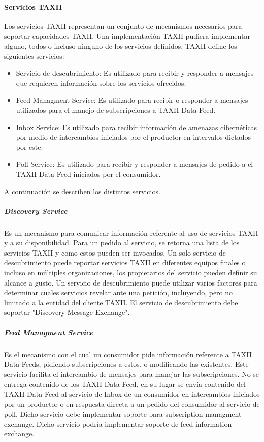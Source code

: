 \paragraph{Servicios TAXII}

Los servicios TAXII representan un conjunto de mecanismos necesarios para 
soportar capacidades TAXII. Una implementación TAXII pudiera implementar alguno, 
todos o incluso ninguno de los servicios definidos.
TAXII define los siguientes servicios:
\begin{itemize}
  \item Servicio de descubrimiento: Es utilizado para recibir y responder a 
  mensajes que requieren información sobre los servicios ofrecidos.
  \item Feed Managment Service: Es utilizado para recibir o responder a mensajes 
  utilizados para el manejo de subscripciones a TAXII Data Feed.
  \item Inbox Service: Es utilizado para recibir información de amenazas 
  cibernéticas por medio de intercambios iniciados por el productor en intervalos 
  dictados por este.
  \item Poll Service: Es utilizado para recibir y responder a mensajes de pedido 
  a el TAXII Data Feed iniciados por el consumidor.
\end{itemize}

A continuación se describen los distintos servicios.

\subparagraph{Discovery Service}

Es un mecanismo para comunicar información referente al uso de servicios TAXII y 
a su disponibilidad. Para un pedido al servicio, se retorna una lista de los 
servicios TAXII y como estos pueden ser invocados. Un solo servicio de 
descubrimiento puede reportar servicios TAXII en diferentes equipos finales o 
incluso en múltiples organizaciones, los propietarios del servicio pueden 
definir su alcance a gusto. Un servicio de descubrimiento puede utilizar 
varios factores para determinar cuales servicios revelar ante una petición, 
incluyendo, pero no limitado a la entidad del cliente TAXII.
El servicio de descubrimiento debe soportar "Discovery Message Exchange".

\subparagraph{Feed Managment Service}

Es el mecanismo con el cual un consumidor pide información referente a TAXII 
Data Feeds, pidiendo subscripciones a estos, o modificando las existentes. Este 
servicio facilita el intercambio de mensajes para manejar las subscripciones. 
No se entrega contenido de los TAXII Data Feed, en su lugar se envía 
contenido del TAXII Data Feed al servicio de Inbox de un consumidor en intercambios 
iniciados por un productor o en respuesta directa a un pedido del consumidor al 
servicio de poll.
Dicho servicio debe implementar soporte para subscription managment exchange.
Dicho servicio podría implementar soporte de feed information exchange.

